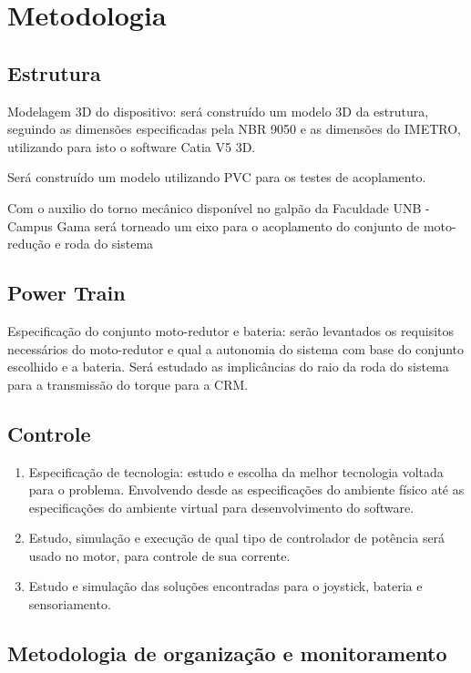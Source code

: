\chapter[Metodologia]{Metodologia}


\section{Estrutura}

Modelagem 3D do dispositivo: será construído um modelo 3D da estrutura, seguindo as dimensões especificadas pela NBR 9050 \cite{nbr9050} e as dimensões do IMETRO, utilizando para isto o software Catia V5 3D.

Será construído um modelo utilizando PVC para os testes de acoplamento.

Com o auxilio do torno mecânico disponível no galpão da Faculdade UNB - Campus Gama será torneado um eixo para o acoplamento do conjunto de moto-redução e roda do sistema

\section{Power Train}

Especificação do conjunto moto-redutor e bateria: serão levantados os requisitos necessários do moto-redutor e qual a autonomia do sistema com base do conjunto escolhido e a bateria.
Será estudado as implicâncias do raio da roda do sistema para a transmissão do torque para a CRM.

\section{Controle}

  \begin{enumerate}
    \item Especificação de tecnologia: estudo e escolha da melhor tecnologia voltada para o problema. Envolvendo desde as especificações do ambiente físico até as especificações do ambiente virtual para desenvolvimento do software.
    \item Estudo, simulação e execução de qual tipo de controlador de potência será usado no motor, para controle de sua corrente.
    \item Estudo e simulação das soluções encontradas para o joystick, bateria e sensoriamento.
  \end{enumerate}


\section{Metodologia de organização e monitoramento}

